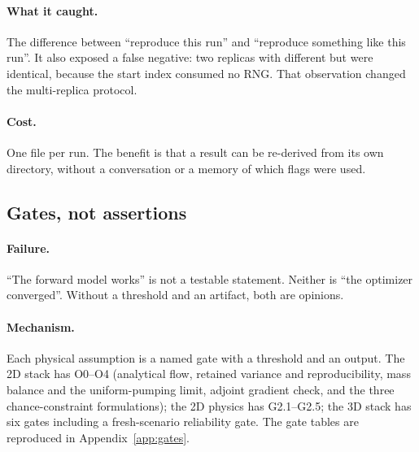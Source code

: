 \paragraph{What it caught.} The difference between ``reproduce this run'' and
``reproduce something like this run''. It also exposed a false negative: two
replicas with different  but  were identical,
because the start index consumed no RNG. That observation changed the
multi-replica protocol.

\paragraph{Cost.} One file per run. The benefit is that a result can be
re-derived from its own directory, without a conversation or a memory of which
flags were used.

\subsection{Gates, not assertions}
\label{sec:gates}

\paragraph{Failure.} ``The forward model works'' is not a testable statement.
Neither is ``the optimizer converged''. Without a threshold and an artifact,
both are opinions.

\paragraph{Mechanism.} Each physical assumption is a named gate with a
threshold and an output. The 2D stack has O0--O4 (analytical flow, retained
variance and reproducibility, mass balance and the uniform-pumping limit,
adjoint gradient check, and the three chance-constraint formulations); the 2D
physics has G2.1--G2.5; the 3D stack has six gates including a fresh-scenario
reliability gate. The gate tables are reproduced in Appendix~\ref{app:gates}.

